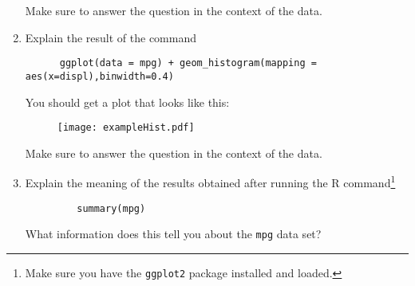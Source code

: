 \documentclass[12pt]{article}
\begin{document}
\begin{enumerate}
 Make sure to answer the question in the context of the data. 
  \item Explain the result of the command
    \begin{verbatim}
      ggplot(data = mpg) + geom_histogram(mapping = aes(x=displ),binwidth=0.4)
    \end{verbatim}
    You should get a plot that looks like this:
    \begin{figure}[htbp]
        \begin{center}
           \texttt{[image: exampleHist.pdf]}
        \end{center}
    \end{figure}
    
 Make sure to answer the question in the context of the data. 
 
 \item Explain the meaning of the results obtained after running the R command\footnote{Make sure you have the {\tt ggplot2} package installed and loaded.}
     \begin{verbatim}
         summary(mpg)
     \end{verbatim}
     What information does this tell you about the {\tt mpg} data set? 
  \end{enumerate}
\end{document}
